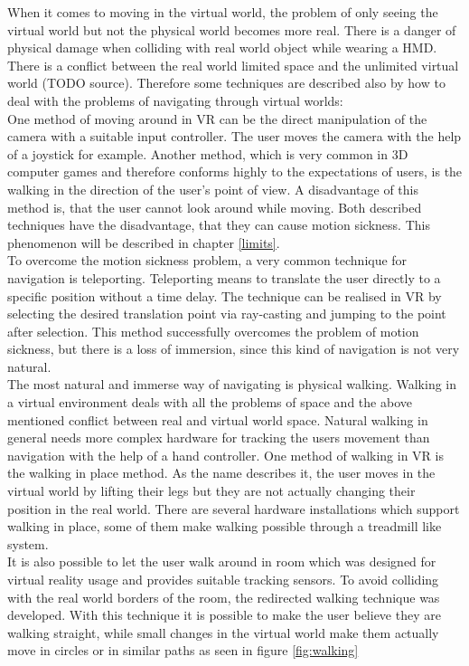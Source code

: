 When it comes to moving in the virtual world, the problem of only seeing the virtual world but not the physical world becomes more real. There is a danger of physical damage when colliding with real world object while wearing a HMD. There is a conflict between the real world limited space and the unlimited virtual world (TODO source). Therefore some techniques are described also by \cite{Dorner.2013} how to deal with the problems of navigating through virtual worlds:\\
One method of moving around in VR can be the direct manipulation of the camera with a suitable input controller. The user moves the camera with the help of a joystick for example. Another method, which is very common in 3D computer games and therefore conforms highly to the expectations of users, is the walking in the direction of the user's point of view. A disadvantage of this method is, that the user cannot look around while moving. Both described techniques have the disadvantage, that they can cause motion sickness. This phenomenon will be described in chapter \ref{limits}.\\
To overcome the motion sickness problem, a very common technique for navigation is teleporting. Teleporting means to translate the user directly to a specific position without a time delay. The technique can be realised in VR by selecting the desired translation point via ray-casting and jumping to the point after selection. This method successfully overcomes the problem of motion sickness, but there is a loss of immersion, since this kind of navigation is not very natural.  \cite{Bozgeyikli.2016}\\
The most natural and immerse way of navigating is physical walking. Walking in a virtual environment deals with all the problems of space and the above mentioned conflict between real and virtual world space. Natural walking in general needs more complex hardware for tracking the users movement than navigation with the help of a hand controller. One method of walking in VR is the walking in place method. As the name describes it, the user moves in the virtual world by lifting their legs but they are not actually changing their position in the real world. There are several hardware installations which support walking in place, some of them make walking possible through a treadmill like system.\\
It is also possible to let the user walk around in room which was designed for virtual reality usage and provides suitable tracking sensors. To avoid colliding with the real world borders of the room, the redirected walking technique was developed. With this technique it is possible to make the user believe they are walking straight, while small changes in the virtual world make them actually move in circles or in similar paths as seen in figure \ref{fig:walking}
